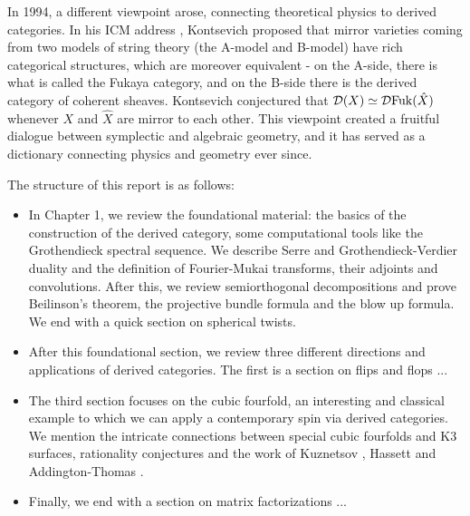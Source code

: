 In 1994, a different viewpoint arose, connecting theoretical physics to derived categories. In his ICM address \cite{kontsevich_homological_1994}, Kontsevich proposed that mirror varieties coming from two models of string theory (the A-model and B-model) have rich categorical structures, which are moreover equivalent - on the A-side, there is what is called the Fukaya category, and on the B-side there is the derived category of coherent sheaves. Kontsevich conjectured that $\mathcal{D}(X)\simeq \mathcal{D} \mathrm{Fuk}(\hat{X})$ whenever $X$ and $\hat{X}$ are mirror to each other. This viewpoint created a fruitful dialogue between symplectic and algebraic geometry, and it has served as a dictionary connecting physics and geometry ever since.

The structure of this report is as follows: 

\begin{itemize}
    \item In Chapter 1, we review the foundational material: the basics of the construction of the derived category, some computational tools like the Grothendieck spectral sequence. We describe Serre and Grothendieck-Verdier duality and the definition of Fourier-Mukai transforms, their adjoints and convolutions. After this, we review semiorthogonal decompositions and prove Beilinson's theorem, the projective bundle formula and the blow up formula. We end with a quick section on spherical twists.
    \item After this foundational section, we review three different directions and applications of derived categories. The first is a section on flips and flops ... 
    \item The third section focuses on the cubic fourfold, an interesting and classical example to which we can apply a contemporary spin via derived categories. We mention the intricate connections between special cubic fourfolds and K3 surfaces, rationality conjectures and the work of Kuznetsov \cite{KuznetsovDerivedCubic}, Hassett \cite{hassett_special_2000} and Addington-Thomas \cite{addington_hodge_2014}. 
    \item Finally, we end with a section on matrix factorizations ...
\end{itemize}





